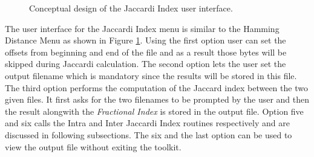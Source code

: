 \begin{figure}
\centering
{}
\caption{Conceptual design of the Jaccardi Index user interface.}
\label{img:jaccard_ui}
\end{figure}
The user interface for the Jaccardi Index menu is similar to the Hamming Distance Menu as shown in Figure \ref{img:jaccard_ui}. Using the first option user can set the offsets from beginning and end of the file and as a result those bytes will be skipped during Jaccardi calculation. The second option lets the user set the output filename which is mandatory since the results will be stored in this file. The third option performs the computation of the Jaccard index between the two given
files. It first asks for the two filenames to be prompted by the user and then the result alongwith the \emph{Fractional Index} is stored in the output file. Option five and six calls the Intra and Inter Jaccardi Index routines respectively and are discussed in following subsections. The six and the last option can be used to view the output file without exiting the toolkit.\\

